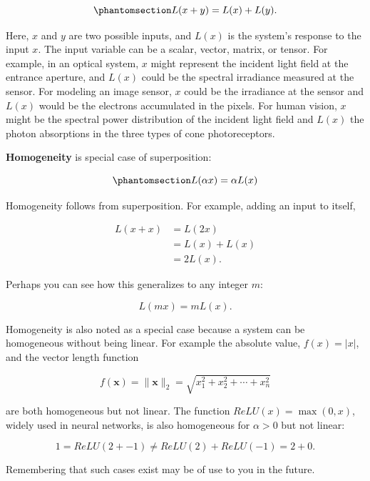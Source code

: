 \documentclass[
  letterpaper,
]{book}
\begin{document}
\begin{equation}\phantomsection\label{eq-superposition}{
L(x + y) = L(x) + L(y).
}\end{equation}

Here, \(x\) and \(y\) are two possible inputs, and \(L(x)\) is the
system's response to the input \(x\). The input variable can be a
scalar, vector, matrix, or tensor. For example, in an optical system,
\(x\) might represent the incident light field at the entrance aperture,
and \(L(x)\) could be the spectral irradiance measured at the sensor.
For modeling an image sensor, \(x\) could be the irradiance at the
sensor and \(L(x)\) would be the electrons accumulated in the pixels.
For human vision, \(x\) might be the spectral power distribution of the
incident light field and \(L(x)\) the photon absorptions in the three
types of cone photoreceptors.

\textbf{Homogeneity} is special case of superposition:

\begin{equation}\phantomsection\label{eq-homogeneity}{
L(\alpha x) = \alpha L(x)
}\end{equation}

Homogeneity follows from superposition. For example, adding an input to
itself,

\[\begin{aligned}
L(x + x) &= L(2x) \nonumber  \\ 
&= L(x) + L(x) \nonumber \\
&= 2L(x) . \nonumber
\end{aligned}
\]

Perhaps you can see how this generalizes to any integer \(m\):

\[
L(m x) = m L(x).
\]

Homogeneity is also noted as a special case because a system can be
homogeneous without being linear. For example the absolute value,
\(f(x) = |x|\), and the vector length function

\[
f(\mathbf{x}) = \|\mathbf{x}\|_2 = \sqrt{x_1^2 + x_2^2 + \cdots + x_n^2}
\]

are both homogeneous but not linear. The function
\(ReLU(x) = \max(0, x)\), widely used in neural networks, is also
homogeneous for \(\alpha > 0\) but not linear:

\[
1 = ReLU(2 + -1) \neq ReLU(2) + ReLU(-1) = 2 + 0.
\]

Remembering that such cases exist may be of use to you in the future.
\end{document}
